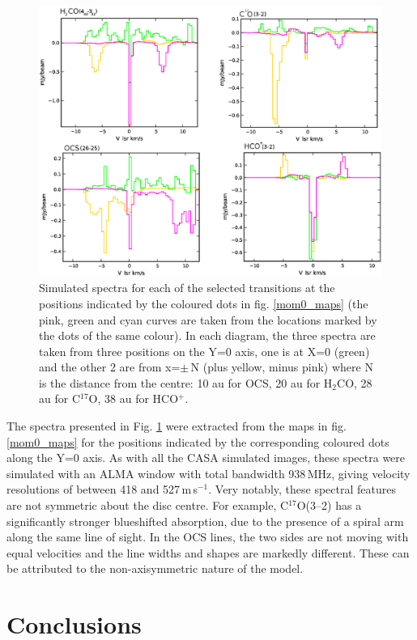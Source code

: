 \documentclass[useAMS,usenatbib]{mn2e}
\begin{document}
\begin{figure}
 \includegraphics[width=168mm]{Figures/sim/fig15.eps}
 \caption{Simulated spectra for each of the selected transitions at the positions indicated by the coloured dots in fig. \ref{mom0_maps} (the pink, green and cyan curves are taken from the locations marked by the dots of the same colour). In each diagram, the three spectra are taken from three positions on the Y=0 axis, one is at X=0 (green) and the other 2 are from x=$\pm\,$N (plus yellow, minus pink) where N is the distance from the centre: 10 au for OCS, 20 au for H$_2$CO, 28 au for C$^{17}$O, 38 au for HCO$^+$.}
 \label{spectra}
\end{figure}

The spectra presented in Fig. \ref{spectra} were extracted from the maps in fig. \ref{mom0_maps} for the positions indicated by the corresponding coloured dots along the Y=0 axis. As with all the CASA simulated images, these spectra were simulated with an ALMA window with total bandwidth 938$\,$MHz, giving velocity resolutions of between 418 and 527\,m\,s$^{-1}$. Very notably, these spectral features are not symmetric about the disc centre. For example, C$^{17}$O(3--2) has a significantly stronger blueshifted absorption, due to the presence of a spiral arm along the same line of sight. In the OCS lines, the two sides are not moving with equal velocities and the line widths and shapes are markedly different. These can be attributed to the non-axisymmetric nature of the model.

\section{Conclusions} \label{sec:discussion}
\end{document}

